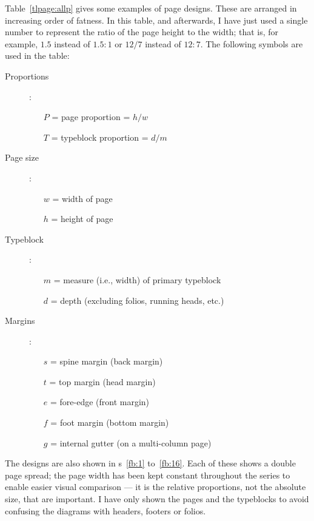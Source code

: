 \documentclass[10pt,letterpaper]{memoir}
\begin{document}
  Table~\ref{tlpage:allp} gives some examples of 
page designs. These are arranged in increasing order of
fatness. In this table, and afterwards, I have just used a single number
to represent the ratio of the page height to the width; that is, for example,
$1.5$ instead of $1.5 : 1$ or $12/7$ instead of $12 : 7$.
The following symbols are used in the table:
\begin{description}
\item[Proportions]:
  \begin{itemize}
  \item[$P$] = page proportion = $h/w$
  \item[$T$] = typeblock proportion = $d/m$
  \end{itemize}
\item[Page size]:
  \begin{itemize}
  \item[$w$] = width of page
  \item[$h$] = height of page
  \end{itemize}
\item[Typeblock]:
  \begin{itemize}
  \item[$m$] = measure (i.e., width) of primary typeblock
  \item[$d$] = depth (excluding folios, running heads, etc.)
  \end{itemize}
\item[Margins]:
  \begin{itemize}
  \item[$s$] = spine margin (back margin)
  \item[$t$] = top margin (head margin)
  \item[$e$] = fore-edge (front margin)
  \item[$f$] = foot margin (bottom margin)
  \item[$g$] = internal gutter (on a multi-column page)
  \end{itemize}
\end{description}
    The designs are also shown in \figurerefname s~\ref{fb:1} 
to~\ref{fb:16}. Each of these shows a double page spread; the 
page width has been kept constant throughout the series to enable easier
visual comparison --- it is the relative proportions, not the absolute size, 
that are important. I have only shown the pages and the typeblocks to avoid
confusing the diagrams with headers, footers 
or folios.
\end{document}
